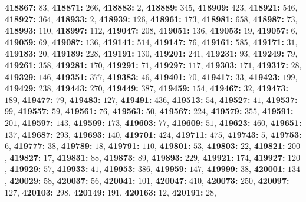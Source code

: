 \textsf{\bfseries 418867:} $83$, \textsf{\bfseries 418871:} $266$, \textsf{\bfseries 418883:} $2$, \textsf{\bfseries 418889:} $345$, \textsf{\bfseries 418909:} $423$, \textsf{\bfseries 418921:} $546$, \textsf{\bfseries 418927:} $364$, \textsf{\bfseries 418933:} $2$, \textsf{\bfseries 418939:} $126$, \textsf{\bfseries 418961:} $173$, \textsf{\bfseries 418981:} $658$, \textsf{\bfseries 418987:} $73$, \textsf{\bfseries 418993:} $110$, \textsf{\bfseries 418997:} $112$, \textsf{\bfseries 419047:} $208$, \textsf{\bfseries 419051:} $136$, \textsf{\bfseries 419053:} $19$, \textsf{\bfseries 419057:} $6$, \textsf{\bfseries 419059:} $69$, \textsf{\bfseries 419087:} $136$, \textsf{\bfseries 419141:} $514$, \textsf{\bfseries 419147:} $76$, \textsf{\bfseries 419161:} $585$, \textsf{\bfseries 419171:} $31$, \textsf{\bfseries 419183:} $20$, \textsf{\bfseries 419189:} $228$, \textsf{\bfseries 419191:} $130$, \textsf{\bfseries 419201:} $241$, \textsf{\bfseries 419231:} $93$, \textsf{\bfseries 419249:} $79$, \textsf{\bfseries 419261:} $358$, \textsf{\bfseries 419281:} $170$, \textsf{\bfseries 419291:} $71$, \textsf{\bfseries 419297:} $117$, \textsf{\bfseries 419303:} $171$, \textsf{\bfseries 419317:} $28$, \textsf{\bfseries 419329:} $146$, \textsf{\bfseries 419351:} $377$, \textsf{\bfseries 419383:} $46$, \textsf{\bfseries 419401:} $70$, \textsf{\bfseries 419417:} $33$, \textsf{\bfseries 419423:} $199$, \textsf{\bfseries 419429:} $238$, \textsf{\bfseries 419443:} $270$, \textsf{\bfseries 419449:} $387$, \textsf{\bfseries 419459:} $154$, \textsf{\bfseries 419467:} $32$, \textsf{\bfseries 419473:} $189$, \textsf{\bfseries 419477:} $79$, \textsf{\bfseries 419483:} $127$, \textsf{\bfseries 419491:} $436$, \textsf{\bfseries 419513:} $54$, \textsf{\bfseries 419527:} $41$, \textsf{\bfseries 419537:} $99$, \textsf{\bfseries 419557:} $59$, \textsf{\bfseries 419561:} $76$, \textsf{\bfseries 419563:} $50$, \textsf{\bfseries 419567:} $224$, \textsf{\bfseries 419579:} $355$, \textsf{\bfseries 419591:} $201$, \textsf{\bfseries 419597:} $143$, \textsf{\bfseries 419599:} $173$, \textsf{\bfseries 419603:} $77$, \textsf{\bfseries 419609:} $51$, \textsf{\bfseries 419623:} $460$, \textsf{\bfseries 419651:} $137$, \textsf{\bfseries 419687:} $293$, \textsf{\bfseries 419693:} $140$, \textsf{\bfseries 419701:} $424$, \textsf{\bfseries 419711:} $475$, \textsf{\bfseries 419743:} $5$, \textsf{\bfseries 419753:} $6$, \textsf{\bfseries 419777:} $38$, \textsf{\bfseries 419789:} $18$, \textsf{\bfseries 419791:} $110$, \textsf{\bfseries 419801:} $53$, \textsf{\bfseries 419803:} $22$, \textsf{\bfseries 419821:} $200$, \textsf{\bfseries 419827:} $17$, \textsf{\bfseries 419831:} $88$, \textsf{\bfseries 419873:} $89$, \textsf{\bfseries 419893:} $229$, \textsf{\bfseries 419921:} $174$, \textsf{\bfseries 419927:} $120$, \textsf{\bfseries 419929:} $57$, \textsf{\bfseries 419933:} $41$, \textsf{\bfseries 419953:} $386$, \textsf{\bfseries 419959:} $147$, \textsf{\bfseries 419999:} $38$, \textsf{\bfseries 420001:} $134$, \textsf{\bfseries 420029:} $58$, \textsf{\bfseries 420037:} $56$, \textsf{\bfseries 420041:} $101$, \textsf{\bfseries 420047:} $410$, \textsf{\bfseries 420073:} $250$, \textsf{\bfseries 420097:} $127$, \textsf{\bfseries 420103:} $298$, \textsf{\bfseries 420149:} $191$, \textsf{\bfseries 420163:} $12$, \textsf{\bfseries 420191:} $28$, 
